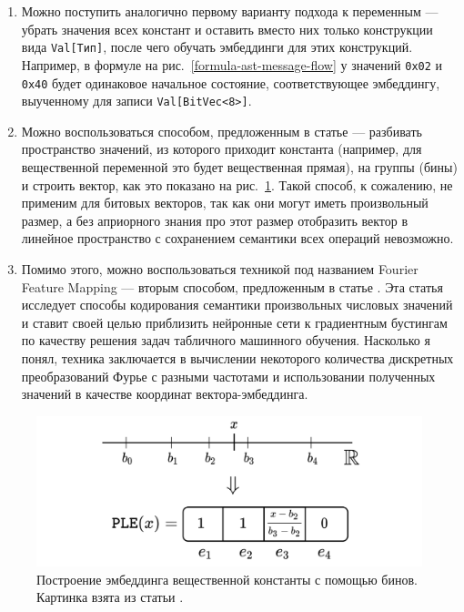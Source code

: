 \begin{enumerate}
    \item Можно поступить аналогично первому варианту подхода к переменным --- убрать значения всех констант и оставить вместо них только конструкции вида \texttt{Val[Тип]}, после чего обучать эмбеддинги для этих конструкций. Например, в формуле на рис.~\ref{formula-ast-message-flow} у значений \texttt{0x02} и \texttt{0x40} будет одинаковое начальное состояние, соответствующее эмбеддингу, выученному для записи \texttt{Val[BitVec<8>]}.
    \item Можно воспользоваться способом, предложенным в статье \cite{embeddings-for-numerical-features-paper} --- разбивать пространство значений, из которого приходит константа (например, для вещественной переменной это будет вещественная прямая), на группы (бины) и строить вектор, как это показано на рис.~\ref{linear-bins-for-values}. Такой способ, к сожалению, не применим для битовых векторов, так как они могут иметь произвольный размер, а без априорного знания про этот размер отобразить вектор в линейное пространство с сохранением семантики всех операций невозможно.
    \item Помимо этого, можно воспользоваться техникой под названием Fourier Feature Mapping \cite{ffm-paper-1} \cite{ffm-paper-2} --- вторым способом, предложенным в статье \cite{embeddings-for-numerical-features-paper}. Эта статья исследует способы кодирования семантики произвольных числовых значений и ставит своей целью приблизить нейронные сети к градиентным бустингам по качеству решения задач табличного машинного обучения. Насколько я понял, техника заключается в вычислении некоторого количества дискретных преобразований Фурье с разными частотами и использовании полученных значений в качестве координат вектора-эмбеддинга.
\end{enumerate}

\begin{figure}[ht]
\begin{center}
    \includegraphics[scale=0.25]{./assets/linear-bins-for-values.png}
    \caption{\label{linear-bins-for-values} Построение эмбеддинга вещественной константы с помощью бинов. Картинка взята из статьи \cite{embeddings-for-numerical-features-paper}.}
\end{center}
\end{figure}


